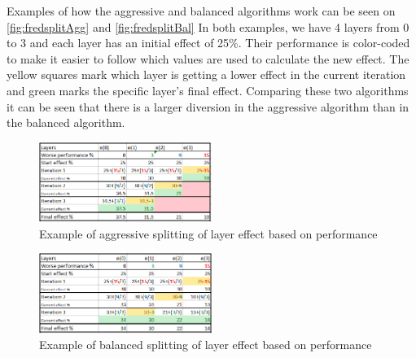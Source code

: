 Examples of how the aggressive and balanced algorithms work can be seen on \autoref{fig:fredsplitAgg} and \autoref{fig:fredsplitBal}
In both examples, we have 4 layers from 0 to 3 and each layer has an initial effect of 25\%.
Their performance is color-coded to make it easier to follow which values are used to calculate the new effect.
The yellow squares mark which layer is getting a lower effect in the current iteration and green marks the specific layer's final effect.
Comparing these two algorithms it can be seen that there is a larger diversion in the aggressive algorithm than in the balanced algorithm.

\begin{figure}
    \includegraphics[width=0.5\textwidth]{figures/fredsplit/aggresiveAlgo.png}
    \centering
    \caption{Example of aggressive splitting of layer effect based on performance}
    \label{fig:fredsplitAgg}
\end{figure}

\begin{figure}
    \includegraphics[width=0.5\textwidth]{figures/fredsplit/balancedAlgo.png}
    \centering
    \caption{Example of balanced splitting of layer effect based on performance}
    \label{fig:fredsplitBal}
\end{figure}



